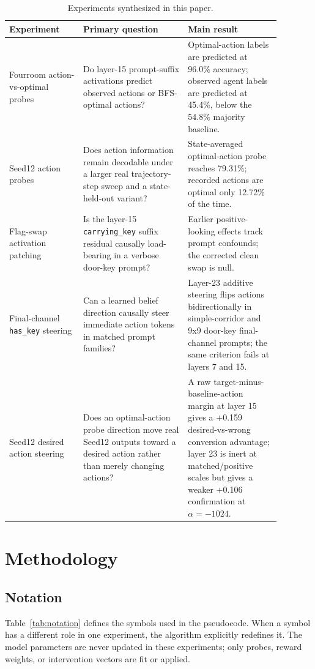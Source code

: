 \documentclass[11pt]{article}
\begin{document}
\begin{table}[t]
\centering
\caption{Experiments synthesized in this paper.}
\label{tab:experiments}
\begin{tabular}{p{0.24\linewidth} p{0.34\linewidth} p{0.30\linewidth}}
\toprule
Experiment & Primary question & Main result \\
\midrule
Fourroom action-vs-optimal probes & Do layer-15 prompt-suffix activations predict observed actions or BFS-optimal actions? & Optimal-action labels are predicted at 96.0\% accuracy; observed agent labels are predicted at 45.4\%, below the 54.8\% majority baseline. \\
Seed12 action probes & Does action information remain decodable under a larger real trajectory-step sweep and a state-held-out variant? & State-averaged optimal-action probe reaches 79.31\%; recorded actions are optimal only 12.72\% of the time. \\
Flag-swap activation patching & Is the layer-15 \texttt{carrying\_key} suffix residual causally load-bearing in a verbose door-key prompt? & Earlier positive-looking effects track prompt confounds; the corrected clean swap is null. \\
Final-channel \texttt{has\_key} steering & Can a learned belief direction causally steer immediate action tokens in matched prompt families? & Layer-23 additive steering flips actions bidirectionally in simple-corridor and 9x9 door-key final-channel prompts; the same criterion fails at layers 7 and 15. \\
Seed12 desired action steering & Does an optimal-action probe direction move real Seed12 outputs toward a desired action rather than merely changing actions? & A raw target-minus-baseline-action margin at layer 15 gives a +0.159 desired-vs-wrong conversion advantage; layer 23 is inert at matched/positive scales but gives a weaker +0.106 confirmation at $\alpha=-1024$. \\
\bottomrule
\end{tabular}
\end{table}

\section{Methodology}

\subsection{Notation}

Table~\ref{tab:notation} defines the symbols used in the pseudocode.
When a symbol has a different role in one experiment, the algorithm explicitly redefines it.
The model parameters are never updated in these experiments; only probes, reward weights, or intervention vectors are fit or applied.
\end{document}
